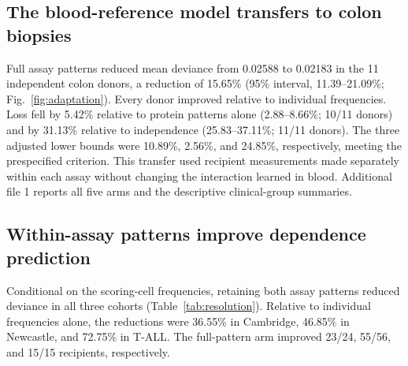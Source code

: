 \documentclass[pdflatex,sn-vancouver-num,iicol]{sn-jnl}
\begin{document}
\subsection{The blood-reference model transfers to colon biopsies}
Full assay patterns reduced mean deviance from 0.02588 to 0.02183 in the
11 independent colon donors, a reduction of 15.65\% (95\% interval,
11.39--21.09\%; Fig.~\ref{fig:adaptation}). Every donor improved relative to
individual frequencies. Loss fell by 5.42\% relative to protein patterns alone
(2.88--8.66\%; 10/11 donors) and by 31.13\% relative to independence
(25.83--37.11\%; 11/11 donors). The three adjusted lower bounds were
10.89\%, 2.56\%, and 24.85\%, respectively, meeting the prespecified criterion.
This transfer used recipient measurements made separately within each assay
without changing the interaction learned in blood. Additional file 1 reports
all five arms and the descriptive clinical-group summaries.

\subsection{Within-assay patterns improve dependence prediction}
Conditional on the scoring-cell frequencies, retaining both assay patterns reduced deviance in all three cohorts
(Table~\ref{tab:resolution}). Relative to individual frequencies alone, the
reductions were 36.55\% in Cambridge, 46.85\% in Newcastle, and 72.75\% in T-ALL.
The full-pattern arm improved 23/24, 55/56, and 15/15 recipients, respectively.
\end{document}
